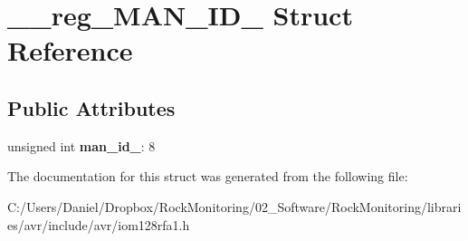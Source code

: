 \hypertarget{struct____reg___m_a_n___i_d__1}{}\section{\+\_\+\+\_\+reg\+\_\+\+M\+A\+N\+\_\+\+I\+D\+\_ Struct Reference}
\label{struct____reg___m_a_n___i_d__1}
\subsection*{Public Attributes}
\begin{DoxyCompactItemize}
\item 
unsigned int {\bfseries man\+\_\+id\+\_}\+: 8\hypertarget{struct____reg___m_a_n___i_d__1_a8107fde02b2918a7e7ed9387d51caf94}{}\label{struct____reg___m_a_n___i_d__1_a8107fde02b2918a7e7ed9387d51caf94}

\end{DoxyCompactItemize}


The documentation for this struct was generated from the following file\+:\begin{DoxyCompactItemize}
\item 
C\+:/\+Users/\+Daniel/\+Dropbox/\+Rock\+Monitoring/02\+\_\+\+Software/\+Rock\+Monitoring/libraries/avr/include/avr/iom128rfa1.\+h\end{DoxyCompactItemize}

